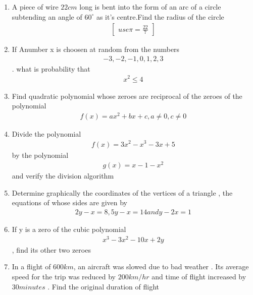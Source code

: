\documentclass[12pt,-letter paper]{article}
\providecommand{\myvec}[1]{\ensuremath{\begin{bmatrix}#1\end{bmatrix}}}
\begin{document}
\begin{enumerate}
\item A piece of wire $22cm$ long is bent into the form of an arc of a circle subtending an angle of $60^\circ$ as it's centre.Find the radius of the circle \begin{align}\myvec{use\pi=\frac{22}{7}}\end{align}
	\item If Anumber x is choosen at random from the numbers \begin{align}-3,-2,-1,0,1,2,3\end{align}. what is probability that \begin{align}x^2 \leq4\end{align}
		\item Find quadratic polynomial whose zeroes are reciprocal of the zeroes of the polynomial \begin{align}f(x)=ax^2+bx+c, a\neq 0,c\neq 0\end{align}
			\item Divide the polynomial \begin{align}f(x)=3x^2-x^3-3x+5\end{align} by the polynomial \begin{align}g(x)=x-1-x^2\end{align} and verify the division algorithm
		 
				\item Determine graphically the coordinates of the vertices of a triangle , the equations of whose sides are given by \begin{align}2y-x=8, 5y-x=14 and y-2x=1\end{align}
					\item If y is a zero of the cubic polynomial \begin{align}x^3-3x^2-10x+2y\end{align}, find its other two zeroes
	\item In a flight of $600km$, an aircraft was slowed due to bad weather . Its average speed for the trip was reduced by $200km/hr$ and time of flight increased by $30 minutes$ . Find the original duration of flight 


\end{enumerate}
\end{document}
